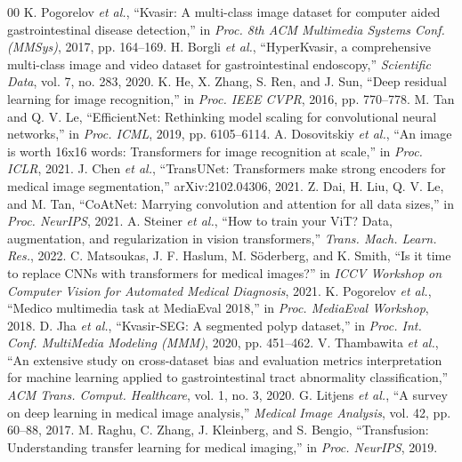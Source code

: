 \documentclass[conference]{IEEEtran}
\begin{document}
\begin{thebibliography}{00}
 K. Pogorelov \emph{et al.}, ``Kvasir: A multi-class image dataset for computer aided gastrointestinal disease detection,'' in \emph{Proc. 8th ACM Multimedia Systems Conf. (MMSys)}, 2017, pp. 164--169.
 H. Borgli \emph{et al.}, ``HyperKvasir, a comprehensive multi-class image and video dataset for gastrointestinal endoscopy,'' \emph{Scientific Data}, vol. 7, no. 283, 2020.
 K. He, X. Zhang, S. Ren, and J. Sun, ``Deep residual learning for image recognition,'' in \emph{Proc. IEEE CVPR}, 2016, pp. 770--778.
 M. Tan and Q. V. Le, ``EfficientNet: Rethinking model scaling for convolutional neural networks,'' in \emph{Proc. ICML}, 2019, pp. 6105--6114.
 A. Dosovitskiy \emph{et al.}, ``An image is worth 16x16 words: Transformers for image recognition at scale,'' in \emph{Proc. ICLR}, 2021.
 J. Chen \emph{et al.}, ``TransUNet: Transformers make strong encoders for medical image segmentation,'' arXiv:2102.04306, 2021.
 Z. Dai, H. Liu, Q. V. Le, and M. Tan, ``CoAtNet: Marrying convolution and attention for all data sizes,'' in \emph{Proc. NeurIPS}, 2021.
 A. Steiner \emph{et al.}, ``How to train your ViT? Data, augmentation, and regularization in vision transformers,'' \emph{Trans. Mach. Learn. Res.}, 2022.
 C. Matsoukas, J. F. Haslum, M. S\"oderberg, and K. Smith, ``Is it time to replace CNNs with transformers for medical images?'' in \emph{ICCV Workshop on Computer Vision for Automated Medical Diagnosis}, 2021.
 K. Pogorelov \emph{et al.}, ``Medico multimedia task at MediaEval 2018,'' in \emph{Proc. MediaEval Workshop}, 2018.
 D. Jha \emph{et al.}, ``Kvasir-SEG: A segmented polyp dataset,'' in \emph{Proc. Int. Conf. MultiMedia Modeling (MMM)}, 2020, pp. 451--462.
 V. Thambawita \emph{et al.}, ``An extensive study on cross-dataset bias and evaluation metrics interpretation for machine learning applied to gastrointestinal tract abnormality classification,'' \emph{ACM Trans. Comput. Healthcare}, vol. 1, no. 3, 2020.
 G. Litjens \emph{et al.}, ``A survey on deep learning in medical image analysis,'' \emph{Medical Image Analysis}, vol. 42, pp. 60--88, 2017.
 M. Raghu, C. Zhang, J. Kleinberg, and S. Bengio, ``Transfusion: Understanding transfer learning for medical imaging,'' in \emph{Proc. NeurIPS}, 2019.

\end{thebibliography}
\end{document}
